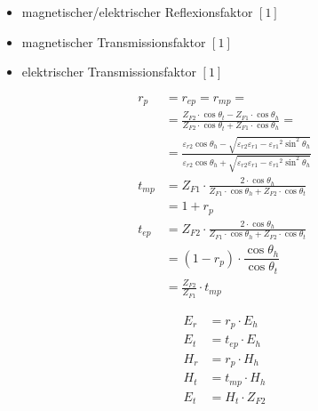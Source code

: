 \begin{itemize}
    \item magnetischer/elektrischer Reflexionsfaktor $[1]$
    \item magnetischer Transmissionsfaktor $[1]$
    \item elektrischer Transmissionsfaktor $[1]$
\end{itemize}
\begin{align*}
    r_p    & =  r_{ep} = r_{mp} =                                                                                                                                                                                                        \\
           & = \frac{Z_{F2} \cdot \cos \theta_t-Z_{F1} \cdot \cos \theta_h}{Z_{F2} \cdot \cos \theta_t+Z_{F1} \cdot \cos \theta_h} =                                                                                                     \\
           & = \frac{\varepsilon_{r2}\cos\theta_h-\sqrt{\varepsilon_{r2}\varepsilon_{r1}-{\varepsilon_{r1}}^2\sin^2\theta_h}}{\varepsilon_{r2}\cos\theta_h+\sqrt{{\varepsilon_{r2}\varepsilon_{r1}-{\varepsilon_{r1}}^2\sin^2\theta_h}}} \\
    t_{mp} & = Z_{F1} \cdot \frac{2 \cdot \cos \theta_h}{Z_{F1} \cdot \cos \theta_h+Z_{F2} \cdot \cos \theta_t}                                                                                                                          \\
           & = 1+r_p                                                                                                                                                                                                                     \\
    t_{ep} & = Z_{F2} \cdot \frac{2 \cdot \cos \theta_h}{Z_{F1} \cdot \cos \theta_h+Z_{F2} \cdot \cos \theta_t}                                                                                                                          \\
           & = (1-r_p) \cdot \dfrac{\cos \theta_h}{\cos \theta_t}                                                                                                                                                                        \\
           & = \frac{Z_{F2}}{Z_{F1}}\cdot t_{mp}
\end{align*}

\begin{align*}
    E_r & = r_p\cdot E_h    \\
    E_t & = t_{ep}\cdot E_h \\
    H_r & = r_p\cdot H_h    \\
    H_t & = t_{mp}\cdot H_h \\
    E_t & = H_t\cdot Z_{F2}
\end{align*}
